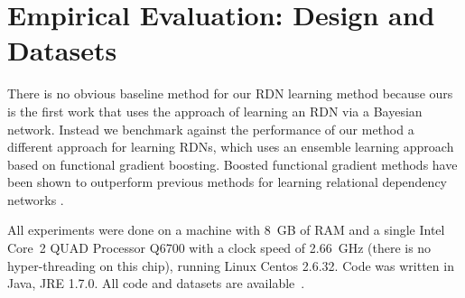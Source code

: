 \documentclass[runningheads,a4paper]{llncs}
\begin{document}
\section{Empirical Evaluation: Design and Datasets}\label{sec:empirical-comparison}
There is no obvious baseline method for our RDN learning method because ours is the first work that uses the approach of learning an RDN via a Bayesian network. Instead we benchmark against the performance of our method a different approach for learning RDNs, which uses an ensemble learning approach based on functional gradient boosting. Boosted functional gradient methods have been shown to outperform previous methods for learning relational dependency networks \cite{Khot2011,Natarajan2012}. 
%
%

All experiments were done on a machine with 8~GB of RAM and a single Intel Core~2 QUAD Processor Q6700 with a clock speed of 2.66~GHz (there is no hyper-threading on this chip), running Linux Centos 2.6.32. Code was written in Java, JRE 1.7.0. All code and datasets are available~\cite{bib:jbnsite}. 
\end{document}
